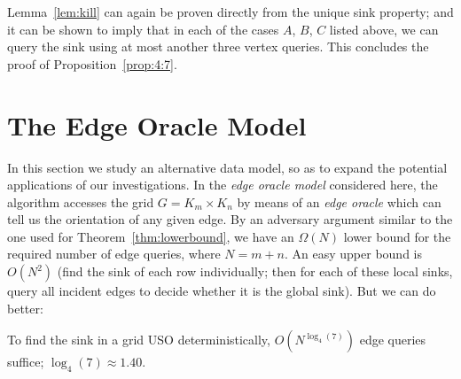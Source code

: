 \documentclass[runningheads,a4paper]{llncs}
\begin{document}
Lemma~\ref{lem:kill} can again be proven directly from the unique sink
property; and it can be shown to imply that in each of the cases $A$, $B$, $C$
listed above, we can query the sink using at most another three vertex
queries. This concludes the proof of Proposition~\ref{prop:4:7}.

\section{The Edge Oracle Model}
\label{section:The edge oracle model}

In this section we study an alternative data model, so as to expand the
potential applications of our investigations.
In the \emph{edge oracle model} considered here, the algorithm accesses the
grid $G = K_m \times K_n$ by means of an \emph{edge oracle} which can tell us
the orientation of any given edge.
By an adversary argument similar to the one used for Theorem~\ref{thm:lowerbound},
we have an $\Omega(N)$ lower bound for the required number of edge queries,
where $N = m+n$.
An easy upper bound is $O(N^2)$ (find the sink of each row individually; then
for each of these local sinks, query all incident edges to decide whether it
is the global sink).
But we can do better:

\begin{theorem}
    \label{thm:timeEdge}
    To find the sink in a grid USO deterministically,
    $O(N ^ {\log_4(7)})$ edge queries suffice; $\log_4(7) \approx
    1.40$.
\end{theorem}
\end{document}

